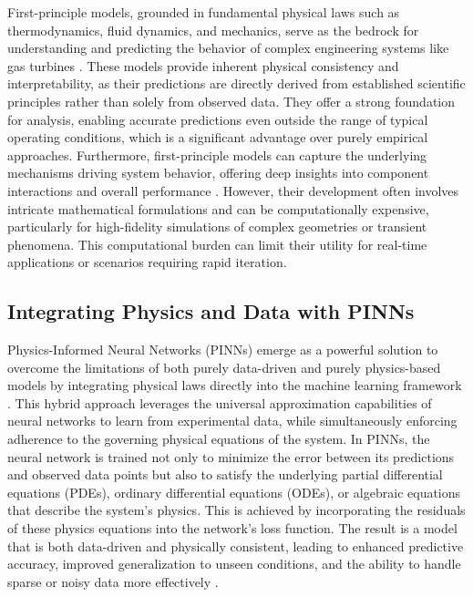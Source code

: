 \documentclass[
  12pt,
  oneside,
  a4paper,
  english,
  brazil]{abntex2}
\begin{document}
First-principle models, grounded in fundamental physical laws such as
thermodynamics, fluid dynamics, and mechanics, serve as the bedrock for
understanding and predicting the behavior of complex engineering systems
like gas turbines \citet{incropera2007fundamentals}. These models
provide inherent physical consistency and interpretability, as their
predictions are directly derived from established scientific principles
rather than solely from observed data. They offer a strong foundation
for analysis, enabling accurate predictions even outside the range of
typical operating conditions, which is a significant advantage over
purely empirical approaches. Furthermore, first-principle models can
capture the underlying mechanisms driving system behavior, offering deep
insights into component interactions and overall performance
\citet{serway2018physics}. However, their development often involves
intricate mathematical formulations and can be computationally
expensive, particularly for high-fidelity simulations of complex
geometries or transient phenomena. This computational burden can limit
their utility for real-time applications or scenarios requiring rapid
iteration.

\subsection{Integrating Physics and Data with
PINNs}\label{integrating-physics-and-data-with-pinns}

Physics-Informed Neural Networks (PINNs) emerge as a powerful solution
to overcome the limitations of both purely data-driven and purely
physics-based models by integrating physical laws directly into the
machine learning framework \citet{raissi2019physics}. This hybrid
approach leverages the universal approximation capabilities of neural
networks to learn from experimental data, while simultaneously enforcing
adherence to the governing physical equations of the system. In PINNs,
the neural network is trained not only to minimize the error between its
predictions and observed data points but also to satisfy the underlying
partial differential equations (PDEs), ordinary differential equations
(ODEs), or algebraic equations that describe the system's physics. This
is achieved by incorporating the residuals of these physics equations
into the network's loss function. The result is a model that is both
data-driven and physically consistent, leading to enhanced predictive
accuracy, improved generalization to unseen conditions, and the ability
to handle sparse or noisy data more effectively
\citet{karniadakis2021physics}.
\end{document}
